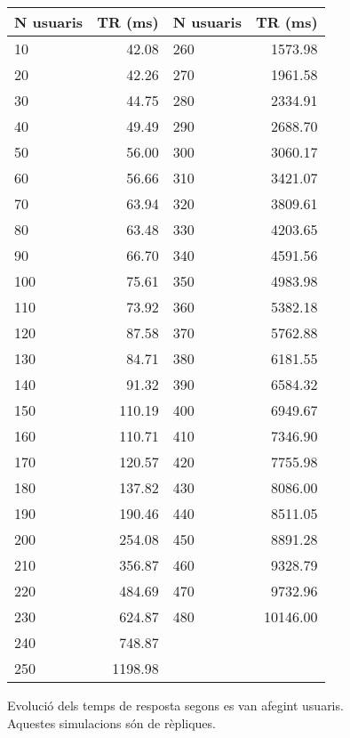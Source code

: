 \begin{figure}
\centering
\begin{tabular}{lrlr}
N usuaris & TR (ms) &
N usuaris & TR (ms) \\

\toprule

10    & 42.08    &  
260   & 1573.98  \\ 
20    & 42.26    &  
270   & 1961.58  \\
30    & 44.75    &  
280   & 2334.91  \\ 
40    & 49.49    &  
290   & 2688.70  \\
50    & 56.00    &  
300   & 3060.17  \\ \midrule
60    & 56.66    &  
310   & 3421.07  \\
70    & 63.94    &  
320   & 3809.61  \\  
80    & 63.48    &  
330   & 4203.65  \\ 
90    & 66.70    &  
340   & 4591.56  \\ 
100   & 75.61    &  
350   & 4983.98  \\ \midrule
110   & 73.92    &  
360   & 5382.18  \\ 
120   & 87.58    &  
370   & 5762.88  \\
130   & 84.71    &  
380   & 6181.55  \\ 
140   & 91.32    &  
390   & 6584.32  \\
150   & 110.19    &  
400   & 6949.67  \\ \midrule
160   & 110.71    &  
410   & 7346.90  \\
170   & 120.57    &  
420   & 7755.98  \\ 
180   & 137.82    &  
430   & 8086.00  \\
190   & 190.46    &  
440   & 8511.05  \\ 
200   & 254.08    &  
450   & 8891.28  \\ \midrule
210   & 356.87    &  
460   & 9328.79  \\ 
220   & 484.69    &  
470   & 9732.96  \\
230   & 624.87    &  
480   & 10146.00  \\ 
240   & 748.87    &  & \\
250   & 1198.98  &  & \\ 

\bottomrule

\end{tabular}
  \caption{Evolució dels temps de resposta segons es van afegint
    usuaris. Aquestes simulacions són de rèpliques.}

  \label{resultats:temps:taula}

\end{figure}
